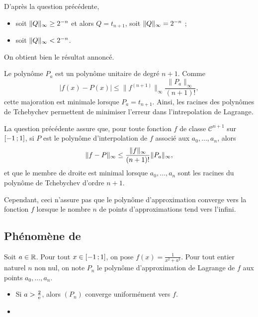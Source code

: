 \begin{solution}
\begin{reponses}
\item D'après la question précédente,
\begin{itemize}
\item soit $\Vert Q \Vert_\infty \geq 2^{-n}$ et alors $Q = t_{n+1}$, soit $\Vert Q \Vert_\infty = 2^{-n}$ ;
\item soit $\Vert Q \Vert_\infty < 2^{-n}$.
\end{itemize}
On obtient bien le résultat annoncé.

\item Le polynôme $P_a$ est un polynôme unitaire de degré $n+1$. Comme
\[
|f(x) - P(x)| \leq \|f^{(n+1)}\|_\infty \frac{\|P_a\|_\infty}{(n+1)!},
\]
cette majoration est minimale lorsque $P_a = t_{n+1}$. Ainsi, les racines des polynômes de Tchebychev permettent de minimiser l'erreur dans l'intrepolation de Lagrange.
\end{reponses}
\end{solution}

\begin{remarque}
La question précédente assure que, pour toute fonction $f$ de classe $\mathscr{C}^{n+1}$ sur $\left[-1\,;1\right]$, si $P$ est le polynôme d'interpolation de $f$ associé aux $a_0,\ldots,a_n$, alors
\[
\Vert f - P \Vert_{\infty} \leq \frac{\Vert f \Vert_\infty}{(n+1)!} \Vert P_a \Vert_{\infty},
\]
et que le membre de droite est minimal lorsque $a_0,\ldots,a_n$ sont les racines du polynôme de Tchebychev d'ordre $n + 1$.

Cependant, ceci n'assure pas que le polynôme d'approximation converge vers la fonction $f$ lorsque le nombre $n$ de points d'approximations tend vers l'infini.
\end{remarque}

\subsection{Phénomène de }



\begin{theo}
Soit $a \in \mathbb{R}$. Pour tout $x \in \left[-1\,;1\right]$, on pose $f(x) = \frac{1}{x^2 + a^2}$. Pour tout entier naturel $n$ non nul, on note $P_n$ le polynôme d'approximation de Lagrange de $f$ aux points $a_0,\ldots,a_n$.
\begin{itemize}
\item Si $a > \frac{2}{\mathrm{e}}$, alors $(P_n)$ converge uniformément vers $f$.

\item
\end{itemize}
\end{theo}

\begin{solution}

\end{solution}
